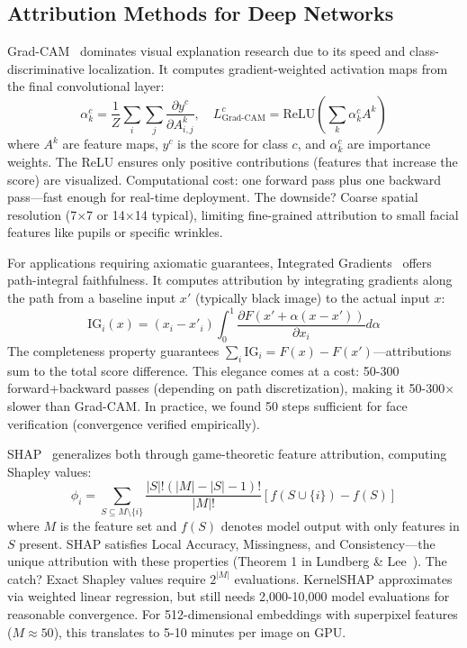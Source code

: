 \subsection{Attribution Methods for Deep Networks}

Grad-CAM~\citep{selvaraju2017gradcam} dominates visual explanation research due to its speed and class-discriminative localization. It computes gradient-weighted activation maps from the final convolutional layer:
\begin{equation}
\alpha_k^c = \frac{1}{Z} \sum_i \sum_j \frac{\partial y^c}{\partial A^k_{i,j}}, \quad
L^c_{\text{Grad-CAM}} = \text{ReLU}\left(\sum_k \alpha_k^c A^k\right)
\end{equation}
where $A^k$ are feature maps, $y^c$ is the score for class $c$, and $\alpha_k^c$ are importance weights. The ReLU ensures only positive contributions (features that increase the score) are visualized. Computational cost: one forward pass plus one backward pass—fast enough for real-time deployment. The downside? Coarse spatial resolution (7$\times$7 or 14$\times$14 typical), limiting fine-grained attribution to small facial features like pupils or specific wrinkles.

For applications requiring axiomatic guarantees, Integrated Gradients~\citep{sundararajan2017axiomatic} offers path-integral faithfulness. It computes attribution by integrating gradients along the path from a baseline input $x'$ (typically black image) to the actual input $x$:
\begin{equation}
\text{IG}_i(x) = (x_i - x'_i) \int_0^1 \frac{\partial F(x' + \alpha(x - x'))}{\partial x_i} d\alpha
\end{equation}
The completeness property guarantees $\sum_i \text{IG}_i = F(x) - F(x')$—attributions sum to the total score difference. This elegance comes at a cost: 50-300 forward+backward passes (depending on path discretization), making it 50-300$\times$ slower than Grad-CAM. In practice, we found 50 steps sufficient for face verification (convergence verified empirically).

SHAP~\citep{lundberg2017unified} generalizes both through game-theoretic feature attribution, computing Shapley values:
\begin{equation}
\phi_i = \sum_{S \subseteq M \setminus \{i\}} \frac{|S|!(|M|-|S|-1)!}{|M|!} [f(S \cup \{i\}) - f(S)]
\end{equation}
where $M$ is the feature set and $f(S)$ denotes model output with only features in $S$ present. SHAP satisfies Local Accuracy, Missingness, and Consistency—the unique attribution with these properties (Theorem 1 in Lundberg \& Lee~\citep{lundberg2017unified}). The catch? Exact Shapley values require $2^{|M|}$ evaluations. KernelSHAP approximates via weighted linear regression, but still needs 2,000-10,000 model evaluations for reasonable convergence. For 512-dimensional embeddings with superpixel features ($M \approx 50$), this translates to 5-10 minutes per image on GPU.

